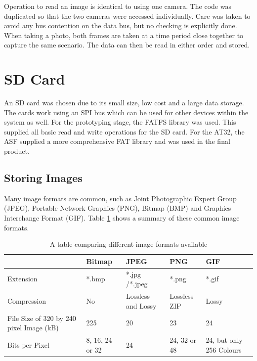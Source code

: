 Operation to read an image is identical to using one camera. The code was duplicated so that the two cameras were accessed individually. Care was taken to avoid any bus contention on the data bus, but no checking is explicitly done. When taking a photo, both frames are taken at a time period close together to capture the same scenario. The data can then be read in either order and stored.

\section{SD Card} \label{sect:SDCard}

An SD card was chosen due to its small size, low cost and a large data storage. 
The cards work using an SPI bus which can be used for other devices within the system as well. For the prototyping stage, the FATFS library \citep{FATFS} was used. This supplied all basic read and write operations for the SD card. For the AT32, the ASF supplied a more comprehensive FAT library and was used in the final product.

\subsection{Storing Images}

Many image formats are common, such as Joint Photographic Expert Group (JPEG), Portable Network Graphics (PNG), Bitmap (BMP) and Graphics Interchange Format (GIF). Table \ref{ImageFormats} shows a summary of these common image formats.


\begin{table}
\centering
\begin{tabular}{p{3cm}p{2cm}p{2cm}p{2cm}p{2cm}} \toprule
			&	Bitmap 		& 	JPEG			 	&	PNG				& 	GIF \\ \toprule
Extension 		& 	*.bmp 		&  	*.jpg /*.jpeg 		& 	*.png				& 	*.gif \\ \midrule
Compression 	& 	No 			& 	Lossless  and Lossy		&	Lossless ZIP			&	Lossy	\\ \midrule
File Size of 320 by 
240 pixel Image (kB) &	225			&	20				&	23				&	24 \\ \midrule
Bits per Pixel		&	8, 16, 24 or 32	&	24				&	24, 32 or 48 			& 	24, but only 256 Colours \\ \bottomrule
\end{tabular}
\caption{A table comparing different image formats available \citep{ImageComparison}}
\label{ImageFormats}
\end{table}


